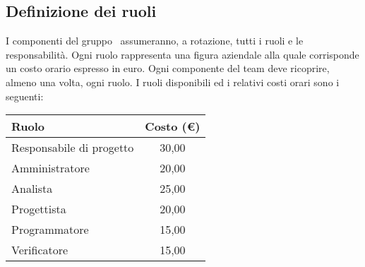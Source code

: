 \documentclass[../PianoProgetto.tex]{subfiles}
\begin{document}
\begin{appendices}
\begin{table}[h]
		\end{table}		
		

	\subsection{Definizione dei ruoli}
	I componenti del gruppo \leaf\ assumeranno, a rotazione, tutti i ruoli e le responsabilità. Ogni ruolo rappresenta una figura aziendale alla quale corrisponde un costo orario espresso in euro. Ogni componente del team deve ricoprire, almeno una volta, ogni ruolo.
I ruoli disponibili ed i relativi costi orari sono i seguenti:

	\begin{table}[h]
	
		\begin{tabularx}{\textwidth}{X C}
			\toprule
			\textbf{Ruolo} & \textbf{Costo (\euro{})} \\
			\midrule
			Responsabile di progetto &  30,00	 \\
			Amministratore &  20,00	 \\
			Analista & 25,00	 \\
			Progettista &  20,00	 \\
			Programmatore & 15,00	 \\
			Verificatore & 15,00	 \\
			\bottomrule
		\end{tabularx}
		
		\end{table}		
\end{appendices}
\end{document}

